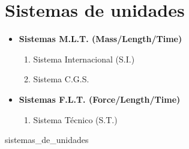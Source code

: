 \documentclass[
	a4paper, 
	12pt, 
	brazilian
]{article}
\begin{document}
	\section{Sistemas de unidades}
	
	\begin{itemize}
		\item\textbf{Sistemas M.L.T. (Mass/Length/Time)}
			\begin{enumerate}
				\item Sistema Internacional (S.I.)
				\item Sistema C.G.S.
			\end{enumerate}
		\item\textbf{Sistemas F.L.T. (Force/Length/Time)}
			\begin{enumerate}
				\item Sistema Técnico (S.T.)
			\end{enumerate}
	\end{itemize}
	{sistemas_de_unidades}
\end{document}
